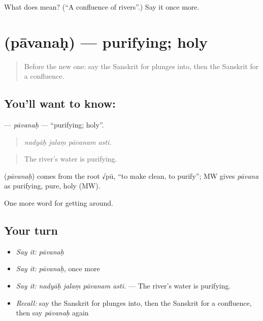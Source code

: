 \begin{tcolorbox}[breakable,colback=teal!4,colframe=teal!35!black,title={Before you move on}]
What does  mean? (\textquotedblleft{}A confluence of rivers\textquotedblright{}.) Say it once more.
\end{tcolorbox}
\section[\texorpdfstring{\sk{पावनः} (pāvanaḥ)}{पावनः (pāvanaḥ)}]{ (pāvanaḥ) — purifying; holy}

\label{lesson:SA-C398-pavanah}



\begin{quote}
Before the new one: say the Sanskrit for plunges into, then the Sanskrit for a confluence.
\end{quote}

\subsection*{You'll want to know: }
\textbf{} — \emph{pāvanaḥ} — \textquotedblleft{}purifying; holy\textquotedblright{}.

\begin{quote}
   
\end{quote}

\begin{quote}
\emph{nadyāḥ jalaṃ pāvanam asti.}
\end{quote}

\begin{quote}
The river's water is purifying.
\end{quote}

\begin{cousinweb}
\textbf{} (\emph{pāvanaḥ}) comes from the root √pū, \textquotedblleft{}to make clean, to purify\textquotedblright{}; MW gives \emph{pāvana} as purifying, pure, holy (MW).
\end{cousinweb}

\begin{grammarlens}[title={What you've built}]
One more word for getting around.
\end{grammarlens}

\subsection*{Your turn}
\begin{itemize}
\raggedright
  \item \emph{Say it:} \emph{pāvanaḥ}
  \item \emph{Say it:} \emph{pāvanaḥ}, once more
  \item \emph{Say it:} \emph{nadyāḥ jalaṃ pāvanam asti.} — The river's water is purifying.
  \item \emph{Recall:} say the Sanskrit for plunges into, then the Sanskrit for a confluence, then say \emph{pāvanaḥ} again
\end{itemize}

